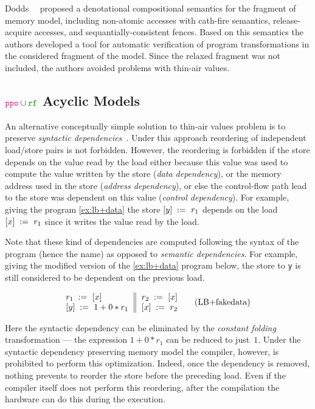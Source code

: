 Dodds~\etal~\cite{Dodds-al:ESOP18} proposed a denotational 
compositional semantics for the fragment of \CMM memory model, 
including non-atomic accesses with cath-fire semantics, 
release-acquire accesses, and sequantially-consistent fences. 
Based on this semantics the authors developed 
a tool for automatic verification of program transformations
in the considered fragment of the \CMM model. 
Since the relaxed fragment was not included, 
the authors avoided problems with thin-air values. 

\subsection{$\lPPO\cup\lRF$ Acyclic Models}
\label{sec:pporf-acyc}

An alternative conceptually simple solution 
to thin-air values problem is to preserve 
\emph{syntactic dependencies}~\cite{Boehm-Demsky:MSPC14, Alglave-al:ASPLOS18}.
Under this approach reordering of independent load/store pairs is not forbidden.
However, the reordering is forbidden if the store depends on the value 
read by the load either because this value 
was used to compute the value written by the store (\emph{data dependency}), 
or the memory address used in the store (\emph{address dependency}),
or else the control-flow path lead to the store was dependent
on this value (\emph{control dependency}).
For example, giving the program \ref{ex:lb+data} 
the store $[y]\;:=_{}\;r_1$ depends 
on the load $[x]\;:=_{}\;r_1$ since 
it writes the value read by the load.

Note that these kind of dependencies are computed following the 
syntax of the program (hence the name) as opposed 
to \emph{semantic dependencies}.
For example, giving the modified version of the \ref{ex:lb+data} program below, 
the store to \texttt{y} is still considered to be dependent on the previous load. 

\begin{equation*}
\inarrII{
  \readInst{}{r_1}{x}           \\
  \writeInst{}{y}{1 + 0 * r_1}  \\
}{
  \readInst{}{r_2}{x}      \\
  \writeInst{}{x}{r_2}     \\
}
\tag{LB+fakedata}\label{ex:lb+fakedata}
\end{equation*}

Here the syntactic dependency can be eliminated 
by the \emph{constant folding} transformation --- 
the expression $1 + 0 * r_1$ can be reduced to just~$1$.
Under the syntactic dependency preserving memory model 
the compiler, however, is prohibited to perform this optimization. 
Indeed, once the dependency is removed, nothing prevents 
to reorder the store before the preceding load. 
Even if the compiler itself does not perform this reordering,
after the compilation the hardware can do this during the execution.   

